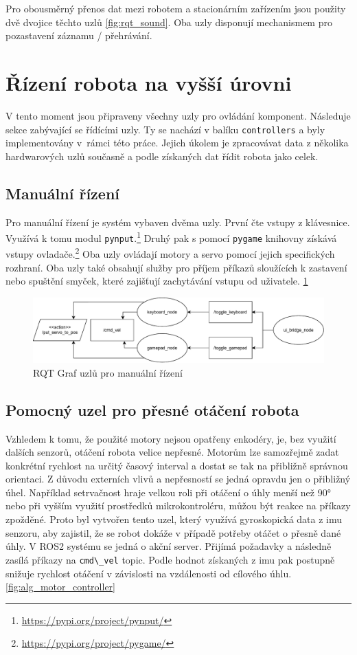 Pro obousměrný přenos dat mezi robotem a stacionárním zařízením jsou použity dvě dvojice těchto uzlů \ref{fig:rqt_sound}. Oba uzly disponují mechanismem pro pozastavení záznamu / přehrávání. 

\section{Řízení robota na vyšší úrovni}
V tento moment jsou připraveny všechny uzly pro ovládání komponent. Následuje sekce zabývající se řídícími uzly. Ty se nachází v balíku \verb|controllers| a byly implementovány v~rámci této práce. Jejich úkolem je zpracovávat data z několika hardwarových uzlů současně a podle získaných dat řídit robota jako celek.

\subsection*{Manuální řízení}
Pro manuální řízení je systém vybaven dvěma uzly. První čte vstupy z klávesnice. Využívá k tomu modul \verb|pynput|.\footnote{\url{https://pypi.org/project/pynput/}} Druhý pak s pomocí \verb|pygame| knihovny získává vstupy ovladače.\footnote{\url{https://pypi.org/project/pygame/}} Oba uzly ovládají motory a servo pomocí jejich specifických rozhraní. Oba uzly také obsahují služby pro příjem příkazů sloužících k zastavení nebo spuštění smyček, které zajišťují zachytávání vstupu od uživatele. \ref{fig:rqt_manual}

\begin{figure}[h!]
	\centering
	\includegraphics[scale=0.65]{obrazky-figures/manual_control_diagram.pdf}
	\caption{RQT Graf uzlů pro manuální řízení}
	\label{fig:rqt_manual}
\end{figure}

\subsection*{Pomocný uzel pro přesné otáčení robota}
Vzhledem k tomu, že použité motory nejsou opatřeny enkodéry, je, bez využití dalších senzorů, otáčení robota velice nepřesné. Motorům lze samozřejmě zadat konkrétní rychlost na určitý časový interval a dostat se tak na přibližně správnou orientaci. Z důvodu externích vlivů a nepřesností se jedná opravdu jen o přibližný úhel. Například setrvačnost hraje velkou roli při otáčení o úhly menší než 90° nebo při vyšším využití prostředků mikrokontroléru, můžou být reakce na příkazy zpožděné.
Proto byl vytvořen tento uzel, který využívá gyroskopická data z imu senzoru, aby zajistil, že se robot dokáže v případě potřeby otáčet o přesně dané úhly. V ROS2 systému se jedná o akční server. Přijímá požadavky a následně zasílá příkazy na \verb|cmd\_vel| topic. Podle hodnot získaných z imu pak postupně snižuje rychlost otáčení v závislosti na vzdálenosti od cílového úhlu. \ref{fig:alg_motor_controller}

